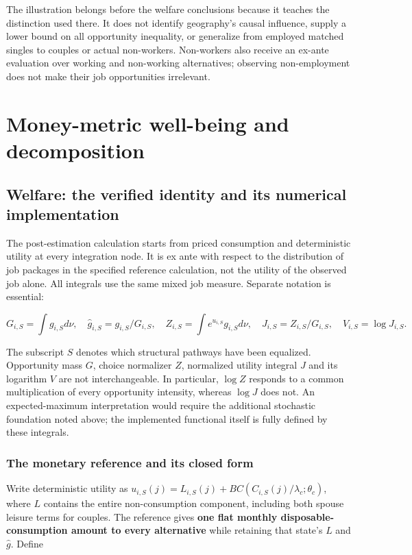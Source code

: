 \documentclass[11pt,a4paper]{article}
\begin{document}
The illustration belongs before the welfare conclusions because it teaches the distinction used there. It does not identify geography's causal influence, supply a lower bound on all opportunity inequality, or generalize from employed matched singles to couples or actual non-workers. Non-workers also receive an ex-ante evaluation over working and non-working alternatives; observing non-employment does not make their job opportunities irrelevant.

\section{Money-metric well-being and decomposition}\label{money-metric-well-being-and-decomposition}

\subsection{Welfare: the verified identity and its numerical implementation}\label{welfare-the-verified-identity-and-its-numerical-implementation}

The post-estimation calculation starts from priced consumption and deterministic utility at every integration node. It is ex ante with respect to the distribution of job packages in the specified reference calculation, not the utility of the observed job alone. All integrals use the same mixed job measure. Separate notation is essential:

\[G_{i,S}=\int g_{i,S}d\nu,\quad \widehat g_{i,S}=g_{i,S}/G_{i,S},\quad
Z_{i,S}=\int e^{u_{i,S}}g_{i,S}d\nu,\quad J_{i,S}=Z_{i,S}/G_{i,S},\quad V_{i,S}=\log J_{i,S}.\]

The subscript \(S\) denotes which structural pathways have been equalized. Opportunity mass \(G\), choice normalizer \(Z\), normalized utility integral \(J\) and its logarithm \(V\) are not interchangeable. In particular, \(\log Z\) responds to a common multiplication of every opportunity intensity, whereas \(\log J\) does not. An expected-maximum interpretation would require the additional stochastic foundation noted above; the implemented functional itself is fully defined by these integrals.

\subsubsection{The monetary reference and its closed form}\label{the-monetary-reference-and-its-closed-form}

Write deterministic utility as \(u_{i,S}(j)=L_{i,S}(j)+BC(C_{i,S}(j)/\lambda_c;\theta_c)\), where \(L\) contains the entire non-consumption component, including both spouse leisure terms for couples. The reference gives \textbf{one flat monthly disposable-consumption amount to every alternative} while retaining that state's \(L\) and \(\widehat g\). Define
\end{document}
